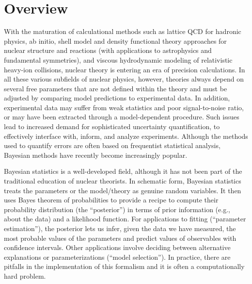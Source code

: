\newpage



\section{Overview}  \label{sec:overview}

With the maturation of calculational methods such as lattice QCD for hadronic
physics, ab initio, shell model and density functional theory approaches for
nuclear structure and reactions (with applications to astrophysics and fundamental
symmetries), and viscous hydrodynamic modeling of relativistic heavy-ion
collisions, nuclear theory is entering an era of precision calculations.
In all these various subfields of nuclear physics, however, theories always
depend on several free parameters that are not defined within the theory and
must be adjusted by comparing model predictions to experimental data. In addition,
experimental data may suffer from weak statistics and poor signal-to-noise
ratio, or may have been extracted through a model-dependent procedure. Such issues
lead to increased demand for sophisticated uncertainty
quantification, to effectively interface with, inform, and analyze experiments.
Although the methods used to quantify errors are often based on frequentist statistical
analysis, Bayesian methods have recently become increasingly popular.

Bayesian statistics is a well-developed field, although it has not been part
of the traditional education of nuclear theorists. In schematic form, Bayesian
statistics treats the parameters or the model/theory as genuine random
variables. It then uses Bayes theorem of probabilities to provide a recipe to
compute their probability distribution (the ``posterior'') in terms of prior
information (e.g., about the data) and a likelihood function. For applications
to fitting (``parameter estimation''), the posterior lets us infer, given the
data we have measured, the most probable values of the parameters and predict
values of observables with confidence intervals. Other applications involve
deciding between alternative explanations or parameterizations (``model
selection''). In practice, there are pitfalls in the implementation of this
formalism and it is often a computationally hard problem.

